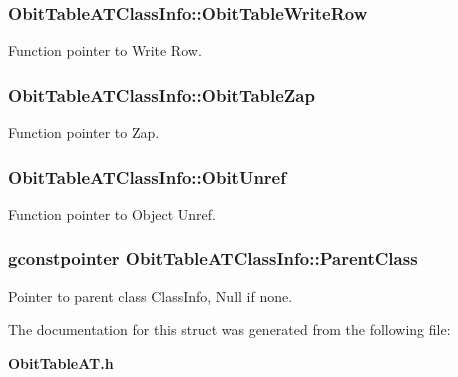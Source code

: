 \subsubsection{ {\bf Obit\-Table\-ATClass\-Info::Obit\-Table\-Write\-Row}}\label{structObitTableATClassInfo_o26}


Function pointer to Write Row. 

\subsubsection{ {\bf Obit\-Table\-ATClass\-Info::Obit\-Table\-Zap}}\label{structObitTableATClassInfo_o19}


Function pointer to Zap. 

\subsubsection{ {\bf Obit\-Table\-ATClass\-Info::Obit\-Unref}}\label{structObitTableATClassInfo_o11}


Function pointer to Object Unref. 

\subsubsection{\setlength{\rightskip}{0pt plus 5cm}gconstpointer {\bf Obit\-Table\-ATClass\-Info::Parent\-Class}}\label{structObitTableATClassInfo_o3}


Pointer to parent class Class\-Info, Null if none. 



The documentation for this struct was generated from the following file:\begin{CompactItemize}
\item 
{\bf Obit\-Table\-AT.h}\end{CompactItemize}
